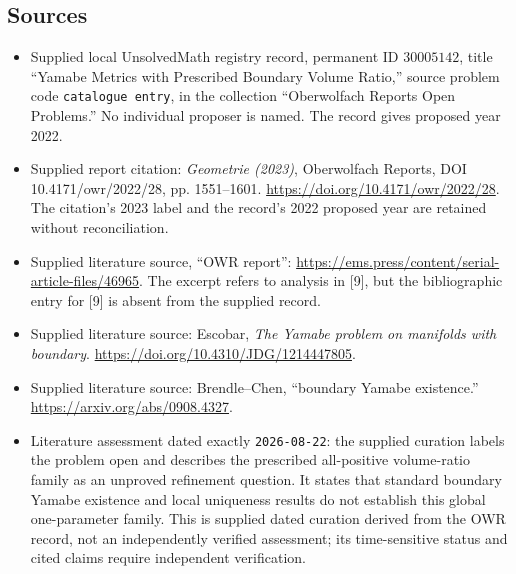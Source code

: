 \documentclass[11pt]{article}
\begin{document}
\subsection{Sources}
\begin{itemize}
\item Supplied local UnsolvedMath registry record, permanent ID \(30005142\), title ``Yamabe Metrics with Prescribed Boundary Volume Ratio,'' source problem code \texttt{catalogue entry}, in the collection ``Oberwolfach Reports Open Problems.'' No individual proposer is named. The record gives proposed year 2022.
\item Supplied report citation: \emph{Geometrie (2023)}, Oberwolfach Reports, DOI 10.4171/owr/2022/28, pp. 1551--1601. \url{https://doi.org/10.4171/owr/2022/28}. The citation's 2023 label and the record's 2022 proposed year are retained without reconciliation.
\item Supplied literature source, ``OWR report'': \url{https://ems.press/content/serial-article-files/46965}. The excerpt refers to analysis in [9], but the bibliographic entry for [9] is absent from the supplied record.
\item Supplied literature source: Escobar, \emph{The Yamabe problem on manifolds with boundary}. \url{https://doi.org/10.4310/JDG/1214447805}.
\item Supplied literature source: Brendle--Chen, ``boundary Yamabe existence.'' \url{https://arxiv.org/abs/0908.4327}.
\item Literature assessment dated exactly \texttt{2026-08-22}: the supplied curation labels the problem open and describes the prescribed all-positive volume-ratio family as an unproved refinement question. It states that standard boundary Yamabe existence and local uniqueness results do not establish this global one-parameter family. This is supplied dated curation derived from the OWR record, not an independently verified assessment; its time-sensitive status and cited claims require independent verification.
\end{itemize}
\end{document}
